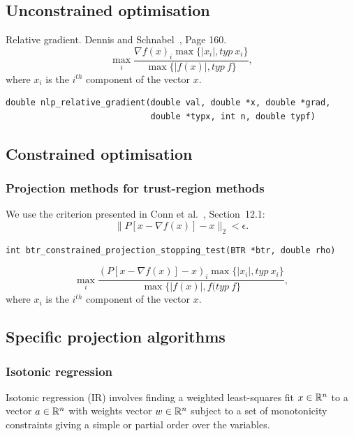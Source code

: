 \subsection{Unconstrained optimisation}

Relative gradient. Dennis and Schnabel~\cite{DennSchn83}, Page 160.
\[
\max_i \frac{ \nabla f(x)_i \max \lbrace |x_i|, typ\ x_i\rbrace}
{\max \lbrace |f(x)|, typ\ f\rbrace},
\]
where $x_i$ is the $i^{th}$ component of the vector $x$.

\begin{verbatim}
double nlp_relative_gradient(double val, double *x, double *grad,
                             double *typx, int n, double typf)
\end{verbatim}

\subsection{Constrained optimisation}

\subsubsection{Projection methods for trust-region methods}

We use the criterion presented in Conn et al.~\cite{ConnGoulToin00},
Section~12.1:
\[
\| P[x-\nabla f(x)] - x \|_2 < \epsilon.
\]

\begin{verbatim}
int btr_constrained_projection_stopping_test(BTR *btr, double rho)
\end{verbatim}

\[
\max_i \frac{ \left(P[x-\nabla f(x)] - x\right)_i \max \lbrace |x_i|,
  typ\ x_i\rbrace} {\max \lbrace |f(x)|, f(typ\ f\rbrace},
\]
where $x_i$ is the $i^{th}$ component of the vector $x$.

\subsection{Specific projection algorithms}

\subsubsection{Isotonic regression}

Isotonic regression (IR) involves finding a weighted least-squares fit $x\in \mathbb{R}^n$ to a vector $a\in \mathbb{R}^n$ with weights vector $w\in \mathbb{R}^n$ subject to a set of monotonicity constraints giving a simple or partial order over the variables.
